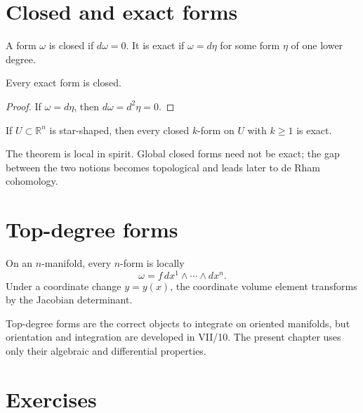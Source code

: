 \section{Closed and exact forms}
\begin{definition}\label{def:vii09-closed-exact}
A form \(\omega\) is closed if \(d\omega=0\). It is exact if \(\omega=d\eta\) for some form \(\eta\) of one lower degree.
\end{definition}

\begin{proposition}\label{prop:vii09-exact-closed}
Every exact form is closed.
\end{proposition}
\begin{proof}
If \(\omega=d\eta\), then \(d\omega=d^2\eta=0\).
\end{proof}

\begin{theorem}\label{thm:vii09-poincare}
If \(U\subset\mathbb R^n\) is star-shaped, then every closed \(k\)-form on \(U\) with \(k\ge1\) is exact.
\end{theorem}
\begin{remark}
The theorem is local in spirit. Global closed forms need not be exact; the gap between the two notions becomes topological and leads later to de Rham cohomology.
\end{remark}

\section{Top-degree forms}
\begin{proposition}\label{prop:vii09-top-form}
On an \(n\)-manifold, every \(n\)-form is locally
\[
\omega=f\,dx^1\wedge\cdots\wedge dx^n.
\]
Under a coordinate change \(y=y(x)\), the coordinate volume element transforms by the Jacobian determinant.
\end{proposition}

\begin{warning}\label{warning:vii09-no-integration}
Top-degree forms are the correct objects to integrate on oriented manifolds, but orientation and integration are developed in VII/10. The present chapter uses only their algebraic and differential properties.
\end{warning}

\section{Exercises}

